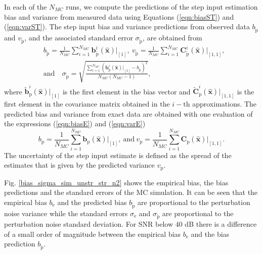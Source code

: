 In each of the $N_{MC}$ runs, we compute the predictions of the step input estimation bias and variance from measured data using Equations (\ref{eqn:biasST}) and (\ref{eqn:varST}). 
The step input bias and variance predictions from observed data $b_{\widetilde{\mathrm{p}}}$ and $v_{\widetilde{\mathrm{p}}}$, and the associated standard error $\sigma_{\widetilde{\mathrm{p}}}$, are obtained from
\begin{equation} \begin{aligned} & b_{\widetilde{\mathrm{p}}} = \frac{1}{N_{MC}} \sum_{i=1}^{N_{MC}}{ \mathbf{b}_{\widetilde{\mathrm{p}}}^i \left( \widehat{\mathbf{x}} \right) \big|_{\left[1\right]} }, \ v_{\widetilde{\mathrm{p}}} = \frac{1}{N_{MC}} \sum_{i=1}^{N_{MC}}{ \mathrm{\mathbf{C}}_{\widetilde{\mathrm{p}}}^i \left( \widehat{\mathbf{x}} \right) \big|_{\left[1,1\right]} },  \\ & \mathrm{and} \quad \sigma_{\widetilde{\mathrm{p}}} = \sqrt{   \frac{ \sum_{i=1}^{N_{MC}}{ \left( \mathbf{b}_{\widetilde{\mathrm{p}}}^i \left( \widehat{\mathbf{x}} \right) \big|_{\left[1\right]} - b_{\widetilde{\mathrm{p}}} \right)^2 } }{N_{MC}\left( N_{MC}-1 \right)}  } , \end{aligned} \end{equation}
where $\widetilde{\mathbf{b}}_{\mathrm{p}}^i \left( \widehat{\mathbf{x}} \right) \big|_{\left[1\right]}$ is the first element in the bias vector and $\widetilde{\mathbf{C}}_{\mathrm{p}}^i \left( \widehat{\mathbf{x}} \right) \big|_{\left[1,1\right]}$ is the first element in the covariance matrix obtained in the $i-\mathrm{th}$ approximations.
The predicted bias and variance from exact data are obtained with one evaluation of the expressions
(\ref{eqn:biasE}) and (\ref{eqn:varE})
\begin{equation} b_{\mathrm{p}} = \frac{1}{N_{MC}} \sum_{i=1}^{N_{MC}}{ \mathbf{b}_{\mathrm{p}} \left( \widehat{\mathbf{x}} \right) \big|_{\left[1\right]} }, \ \mathrm{and} \ v_{\mathrm{p}} = \frac{1}{N_{MC}} \sum_{i=1}^{N_{MC}}{ \mathrm{\mathbf{C}}_{\mathrm{p}} \left( \widehat{\mathbf{x}} \right) \big|_{\left[1,1\right]} } . \end{equation}
The uncertainty of the step input estimate is defined as the spread of the estimates that is given by the predicted variance $v_{\mathrm{p}}$.

Fig. \ref{bias_sigma_sim_unstr_str_n2} shows the empirical bias, the bias predictions and the standard errors of the MC simulation.
It can be seen that the empirical bias $b_\mathrm{e}$ and the predicted bias $b_{\widetilde{\mathrm{p}}}$ are proportional to the perturbation noise variance while the standard errors $\sigma_\mathrm{e}$ and $\sigma_{\widetilde{\mathrm{p}}}$ are proportional to the perturbation noise standard deviation.
For SNR below 40 dB there is a difference of a small order of magnitude between the empirical bias $b_\mathrm{e}$ and the bias prediction $b_{\widetilde{\mathrm{p}}}$. 

